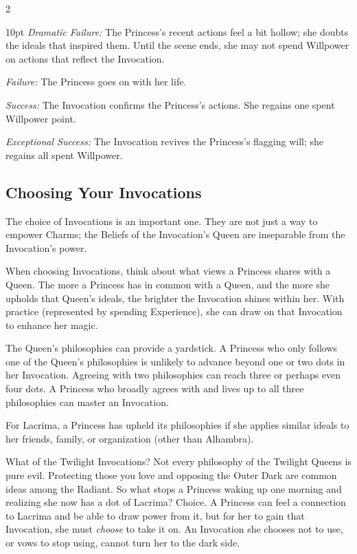 \begin{multicols}{2}
 \begin{myindentpar}{10pt}
    \emph{Dramatic Failure:} The Princess’s recent actions feel a bit hollow; she doubts the ideals that inspired them. Until the scene ends, she may not spend Willpower on actions that reflect the Invocation.

    \emph{Failure:} The Princess goes on with her life.

    \emph{Success:} The Invocation confirms the Princess’s actions. She regains one spent Willpower point.

    \emph{Exceptional Success:} The Invocation revives the Princess’s flagging will; she regains all spent Willpower.
\end{myindentpar}

\subsection*{Choosing Your Invocations}

The choice of Invocations is an important one. They are not just a way to empower Charms; the Beliefs of the Invocation's Queen are inseparable from the Invocation's power.  

When choosing Invocations, think about what views a Princess shares with a Queen. The more a Princess has in common with a Queen, and the more she upholds that Queen's ideals, the brighter the Invocation shines within her. With practice (represented by spending Experience), she can draw on that Invocation to enhance her magic. 

The Queen's philosophies can provide a yardstick. A Princess who only follows one of the Queen's philosophies is unlikely to advance beyond one or two dots in her Invocation. Agreeing with two philosophies can reach three or perhaps even four dots. A Princess who broadly agrees with and lives up to all three philosophies can master an Invocation. 

For Lacrima, a Princess has upheld its philosophies if she applies similar ideals to her friends, family, or organization (other than Alhambra).

What of the Twilight Invocations? Not every philosophy of the Twilight Queens is pure evil. Protecting those you love and opposing the Outer Dark are common ideas 
among the Radiant. So what stops a Princess waking up one morning and realizing she now has a dot of Lacrima? Choice. A Princess can feel a connection to Lacrima 
and be able to draw power from it, but for her to gain that Invocation, she must \textit{choose} to take it on. An Invocation she chooses not to use, or vows to stop using, cannot turn her to the dark side. 



\end{multicols}
